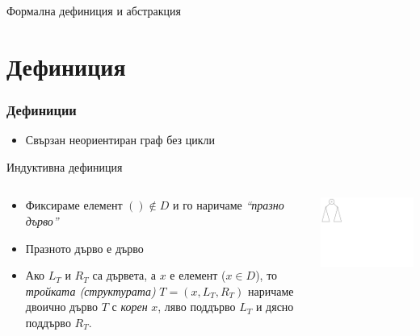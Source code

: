 \documentclass{beamer}
\begin{document}
\begin{frame}
\centerline{Формална дефиниция и абстракция}
\end{frame}


\section{Дефиниция} 


\begin{frame}[fragile]
\frametitle{Дефиниции}

    \begin{itemize}
      \item Свързан неориентиран граф без цикли 
    \end{itemize}

    \vspace{1.5em}
     Индуктивна дефиниция

\begin{columns}[t]
  \begin{column}{0.65\textwidth}


    \begin{itemize}
      \item Фиксираме елемент $() \notin D$ и го наричаме \emph{``празно дърво''}
      \item Празното дърво е дърво 
      \item Ако $L_T$ и $R_T$ са дървета, а $x$ е елемент ($x \in D$), то \emph{тройката (структурата)} $T=(x,L_T,R_T)$ наричаме двоично дърво $T$ с \emph{корен} $x$, ляво поддърво $L_T$ и дясно поддърво $R_T$.
    \end{itemize}

  \end{column}
  \begin{column}{0.35\textwidth}

    \includegraphics[width=9cm]{images/tree_recursive}

  \end{column}
\end{columns}


\end{frame}
\end{document}
